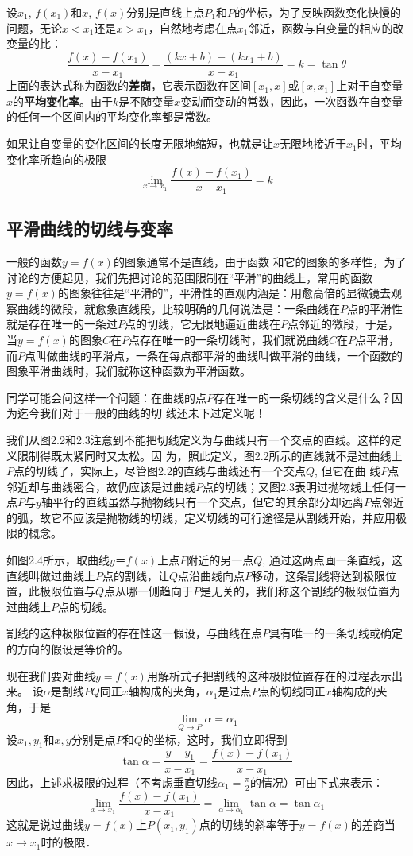 设$x_1$, $f(x_1)$和$x$, $f(x)$分别是直线上点$P_1$和$P$的坐标，为了反映函数变化快慢的问题，无论$x<x_1$还是$x>x_1$，自然地考虑在点$x_1$邻近，函数与自变量的相应的改变量的比：
\[\frac{f(x)-f(x_1)}{x-x_1}=\frac{(kx+b)-(kx_1+b)}{x-x_1}=k=\tan\theta\]
上面的表达式称为函数的\textbf{差商}，它表示函数在区间$[x_1,x]$或$[x,x_1]$上对于自变量$x$的\textbf{平均变化率}。由于$k$是不随变量$x$变动而变动的常数，因此，一次函数在自变量的任何一个区间内的平均变化率都是常数。

如果让自变量的变化区间的长度无限地缩短，也就是让$x$无限地接近于$x_1$时，平均变化率所趋向的极限
\[\lim_{x\to x_1} \frac{f (x) -f (x_1)}{x-x_1} =k\]

\subsection{平滑曲线的切线与变率}
一般的函数$y=f(x)$的图象通常不是直线，由于函数
和它的图象的多样性，为了讨论的方便起见，我们先把讨论的范围限制在“平滑”的曲线上，常用的函数$y=f(x)$的图象往往是“平滑的”，平滑性的直观内涵是：用愈高倍的显微镜去观察曲线的微段，就愈象直线段，比较明确的几何说法是：一条曲线在$P$点的平滑性就是存在唯一的一条过$P$点的切线，它无限地逼近曲线在$P$点邻近的微段，于是，当$y=f(x)$的图象$C$在$P$点存在唯一的一条切线时，我们就说曲线$C$在$P$点平滑，而$P$点叫做曲线的平滑点，一条在每点都平滑的曲线叫做平滑的曲线，一个函数的图象平滑曲线时，我们就称这种函数为平滑函数。

同学可能会问这样一个问题：在曲线的点$P$存在唯一的一条切线的含义是什么？因为迄今我们对于一般的曲线的切
线还未下过定义呢！

我们从图2.2和2.3注意到不能把切线定义为与曲线只有一个交点的直线。这样的定义限制得既太紧同时又太松。因
为，照此定义，图2.2所示的直线就不是过曲线上$P$点的切线了，实际上，尽管图2.2的直线与曲线还有一个交点$Q$, 但它在曲
线$P$点邻近却与曲线密合，故仍应该是过曲线$P$点的切线；又图2.3表明过抛物线上任何一点$P$与$y$轴平行的直线虽然与抛物线只有一个交点，但它的其余部分却远离$P$点邻近的弧，故它不应该是抛物线的切线，定义切线的可行途径是从割线开始，并应用极限的概念。


如图2.4所示，取曲线$y＝f(x)$上点$P$附近的另一点$Q$, 通过这两点画一条直线，这直线叫做过曲线上$P$点的割线，让$Q$点沿曲线向点$P$移动，这条割线将达到极限位置，此极限位置与$Q$点从哪一侧趋向于$P$是无关的，我们称这个割线的极限位置为过曲线上$P$点的切线。

割线的这种极限位置的存在性这一假设，与曲线在点$P$具有唯一的一条切线或确定的方向的假设是等价的。

现在我们要对曲线$y=f(x)$用解析式子把割线的这种极限位置存在的过程表示出来。
设$\alpha$是割线$PQ$同正$x$轴构成的夹角，$\alpha_1$是过点$P$点的切线同正$x$轴构成的夹角，于是
\[\lim_{Q\to P}\alpha=\alpha_1\]
设$x_1,y_1$和$x,y$分别是点$P$和$Q$的坐标，这时，我们立即得到
\[\tan\alpha=\frac{y-y_1}{x-x_1}=\frac{f(x)-f(x_1)}{x-x_1}\]
因此，上述求极限的过程（不考虑垂直切线$\alpha_1=\frac{\pi}{2}$的情况）可由下式来表示：
\[\lim_{x\to x_1}\frac{f(x)-f(x_1)}{x-x_1}=\lim_{\alpha\to \alpha_1}\tan\alpha=\tan\alpha_1\]
这就是说过曲线$y=f(x)$上$P(x_1,y_1)$点的切线的斜率等于$y=f(x)$的差商当$x\to x_1$时的极限．


